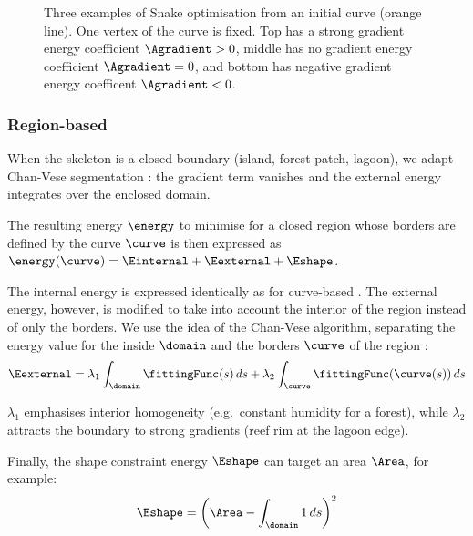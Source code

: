 \begin{figure}
    \caption{Three examples of Snake optimisation from an initial curve (orange line). One vertex of the curve is fixed. Top has a strong gradient energy coefficient $\Agradient > 0$, middle has no gradient energy coefficient $\Agradient=0$, and bottom has negative gradient energy coefficent $\Agradient < 0$. }
    \label{fig:env-obj-snake-gradient-example}
\end{figure}

\subsubsection{Region-based }

When the skeleton is a closed boundary (island, forest patch, lagoon), we adapt Chan-Vese segmentation \cite{Chan2001}: the gradient term vanishes and the external energy integrates over the enclosed domain.

The resulting energy $\energy$ to minimise for a closed region whose borders are defined by the curve $\curve$ is then expressed as $\energy(\curve) = \Einternal + \Eexternal + \Eshape$.

The internal energy is expressed identically as for curve-based . The external energy, however, is modified to take into account the interior of the region instead of only the borders. We use the idea of the Chan-Vese algorithm, separating the energy value for the inside $\domain$ and the borders $\curve$ of the region \cite{Chan2001, Getreuer2012}:
\begin{align}
    \Eexternal = \lambda_1 \int_{\domain}{ \fittingFunc(s) \, ds } + \lambda_2 \int_{\curve}{ \fittingFunc(\curve(s)) \, ds }
\end{align}

$\lambda_1$ emphasises interior homogeneity (e.g.\ constant humidity for a forest), while $\lambda_2$ attracts the boundary to strong gradients (reef rim at the lagoon edge).

Finally, the shape constraint energy $\Eshape$ can target an area $\Area$, for example:
\begin{align}
    \Eshape = \left( \Area - \int_{\domain}{1 \, ds } \right)^2
\end{align}

